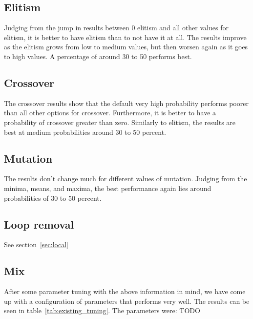 \documentclass{report}
\begin{document}
\subsection{Elitism}
Judging from the jump in results between 0 elitism and all other values for elitism, it is better to have elitism than to not have it at all. The results improve as the elitism grows from low to medium values, but then worsen again as it goes to high values. A percentage of around 30 to 50 performs best. 

\subsection{Crossover}
The crossover results show that the default very high probability performs poorer than all other options for crossover. Furthermore, it is better to have a probability of crossover greater than zero. Similarly to elitism, the results are best at medium probabilities around 30 to 50 percent. 

\subsection{Mutation}
The results don't change much for different values of mutation. Judging from the minima, means, and maxima, the best performance again lies around probabilities of 30 to 50 percent.

\subsection{Loop removal}
See section~\ref{sec:local}

\subsection{Mix}
After some parameter tuning with the above information in mind, we have come up with a configuration of parameters that performs very well. The results can be seen in table~\ref{tab:existing_tuning}. The parameters were: TODO

\end{document}
